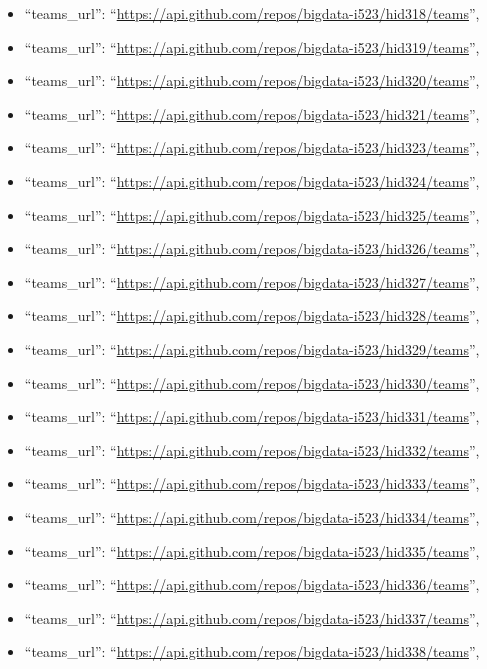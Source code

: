\begin{itemize}
\item
  ``teams\_url'':
  ``\url{https://api.github.com/repos/bigdata-i523/hid318/teams}'',
\item
  ``teams\_url'':
  ``\url{https://api.github.com/repos/bigdata-i523/hid319/teams}'',
\item
  ``teams\_url'':
  ``\url{https://api.github.com/repos/bigdata-i523/hid320/teams}'',
\item
  ``teams\_url'':
  ``\url{https://api.github.com/repos/bigdata-i523/hid321/teams}'',
\item
  ``teams\_url'':
  ``\url{https://api.github.com/repos/bigdata-i523/hid323/teams}'',
\item
  ``teams\_url'':
  ``\url{https://api.github.com/repos/bigdata-i523/hid324/teams}'',
\item
  ``teams\_url'':
  ``\url{https://api.github.com/repos/bigdata-i523/hid325/teams}'',
\item
  ``teams\_url'':
  ``\url{https://api.github.com/repos/bigdata-i523/hid326/teams}'',
\item
  ``teams\_url'':
  ``\url{https://api.github.com/repos/bigdata-i523/hid327/teams}'',
\item
  ``teams\_url'':
  ``\url{https://api.github.com/repos/bigdata-i523/hid328/teams}'',
\item
  ``teams\_url'':
  ``\url{https://api.github.com/repos/bigdata-i523/hid329/teams}'',
\item
  ``teams\_url'':
  ``\url{https://api.github.com/repos/bigdata-i523/hid330/teams}'',
\item
  ``teams\_url'':
  ``\url{https://api.github.com/repos/bigdata-i523/hid331/teams}'',
\item
  ``teams\_url'':
  ``\url{https://api.github.com/repos/bigdata-i523/hid332/teams}'',
\item
  ``teams\_url'':
  ``\url{https://api.github.com/repos/bigdata-i523/hid333/teams}'',
\item
  ``teams\_url'':
  ``\url{https://api.github.com/repos/bigdata-i523/hid334/teams}'',
\item
  ``teams\_url'':
  ``\url{https://api.github.com/repos/bigdata-i523/hid335/teams}'',
\item
  ``teams\_url'':
  ``\url{https://api.github.com/repos/bigdata-i523/hid336/teams}'',
\item
  ``teams\_url'':
  ``\url{https://api.github.com/repos/bigdata-i523/hid337/teams}'',
\item
  ``teams\_url'':
  ``\url{https://api.github.com/repos/bigdata-i523/hid338/teams}'',

\end{itemize}
